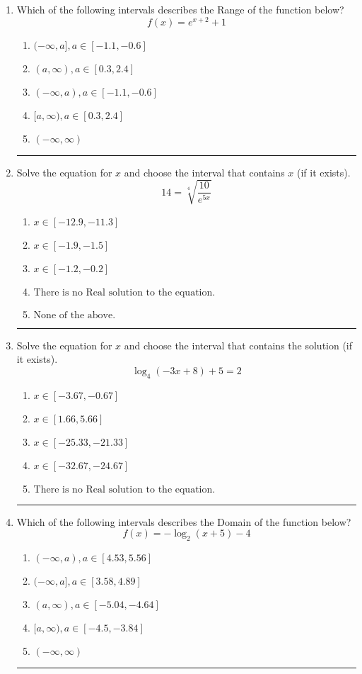\documentclass[14pt]{extbook}
\newcommand{\litem}[1]{\item#1\hspace*{-1cm}\rule{\textwidth}{0.4pt}}
\begin{document}
\begin{enumerate}
{\begin{enumerate}[label=\Alph*.]
\end{enumerate} }
\litem{
Which of the following intervals describes the Range of the function below?\[ f(x) = e^{x+2}+1 \]\begin{enumerate}[label=\Alph*.]
\item \( (-\infty, a], a \in [-1.1, -0.6] \)
\item \( (a, \infty), a \in [0.3, 2.4] \)
\item \( (-\infty, a), a \in [-1.1, -0.6] \)
\item \( [a, \infty), a \in [0.3, 2.4] \)
\item \( (-\infty, \infty) \)

\end{enumerate} }
\litem{
 Solve the equation for $x$ and choose the interval that contains $x$ (if it exists).\[  14 = \sqrt[4]{\frac{10}{e^{5x}}} \]\begin{enumerate}[label=\Alph*.]
\item \( x \in [-12.9, -11.3] \)
\item \( x \in [-1.9, -1.5] \)
\item \( x \in [-1.2, -0.2] \)
\item \( \text{There is no Real solution to the equation.} \)
\item \( \text{None of the above.} \)

\end{enumerate} }
\litem{
Solve the equation for $x$ and choose the interval that contains the solution (if it exists).\[ \log_{4}{(-3x+8)}+5 = 2 \]\begin{enumerate}[label=\Alph*.]
\item \( x \in [-3.67, -0.67] \)
\item \( x \in [1.66, 5.66] \)
\item \( x \in [-25.33, -21.33] \)
\item \( x \in [-32.67, -24.67] \)
\item \( \text{There is no Real solution to the equation.} \)

\end{enumerate} }
\litem{
Which of the following intervals describes the Domain of the function below?\[ f(x) = -\log_2{(x+5)}-4 \]\begin{enumerate}[label=\Alph*.]
\item \( (-\infty, a), a \in [4.53, 5.56] \)
\item \( (-\infty, a], a \in [3.58, 4.89] \)
\item \( (a, \infty), a \in [-5.04, -4.64] \)
\item \( [a, \infty), a \in [-4.5, -3.84] \)
\item \( (-\infty, \infty) \)


\end{enumerate}}
\end{enumerate}
\end{document}
